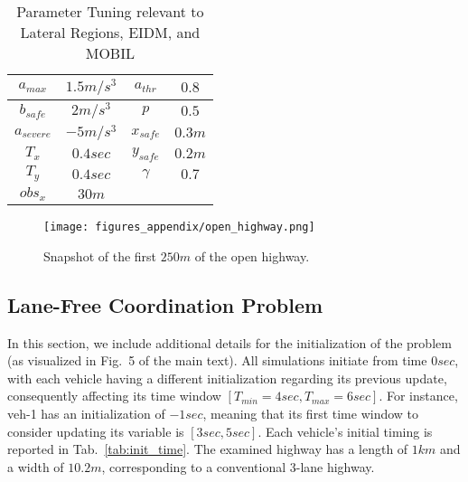 \begin{table}[b]
  \centering
  
  \caption{Parameter Tuning relevant to Lateral Regions, EIDM, and MOBIL} 
  \begin{tabular}{|c|c||c|c|}  
  \hline
     $a_{max}$ & $1.5 m/s^3$ & $a_{thr}$ & $0.8$\\ 
    \hline
    $b_{safe}$ & $2 m/s^3$ & $p$ & $0.5$\\ \hline
    $a_{severe}$ & $-5 m/s^3$ &   $x_{safe}$ & $0.3m$\\ \hline
    $T_x$ & $0.4 sec$ & $y_{safe}$ & $0.2m$ \\ \hline
    $T_y$ & $0.4 sec$ &  $\gamma$ & $0.7$  \\ \hline
    ${obs}_x$ & $30m$ & & \\ \hline   
  \end{tabular}
  \label{tab:lr}  
\end{table}



\begin{figure*}[t]
    \centering
    \texttt{[image: figures\_appendix/open\_highway.png]}
    \caption{Snapshot of the first $250m$ of the open highway.}
    \label{fig:highway_open}
\end{figure*}


\subsection{Lane-Free Coordination Problem}

In this section, we include additional details for the initialization of the problem (as visualized in Fig.~5 of the main text).
All simulations initiate from time $0 sec$, with each vehicle having a different initialization regarding its previous update, consequently affecting its time window $[T_{min}=4sec, T_{max}=6sec]$.
For instance, veh-1 has an initialization of $-1 sec$, meaning that its first time window to consider updating its variable is $[3sec,5sec]$.
Each vehicle's initial timing is reported in Tab.~\ref{tab:init_time}.
The examined highway has a length of $1km$ and a width of $10.2m$, corresponding to a conventional 3-lane highway.

